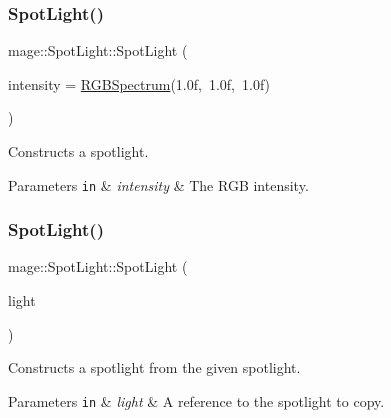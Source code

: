\subsubsection{\texorpdfstring{Spot\+Light()}{SpotLight()}\hspace{0.1cm}{\footnotesize\ttfamily [1/3]}}
{\footnotesize\ttfamily mage\+::\+Spot\+Light\+::\+Spot\+Light (\begin{DoxyParamCaption}\item[{const \hyperlink{structmage_1_1_r_g_b_spectrum}{R\+G\+B\+Spectrum} \&}]{intensity = {\ttfamily \hyperlink{structmage_1_1_r_g_b_spectrum}{R\+G\+B\+Spectrum}(1.0f,~1.0f,~1.0f)} }\end{DoxyParamCaption})\hspace{0.3cm}{\ttfamily [explicit]}}

Constructs a spotlight.


\begin{DoxyParams}[1]{Parameters}
\mbox{\tt in}  & {\em intensity} & The R\+GB intensity. \\
\hline
\end{DoxyParams}
\hypertarget{classmage_1_1_spot_light_a597abd916ed14372be208a68eb01b871}{}\label{classmage_1_1_spot_light_a597abd916ed14372be208a68eb01b871} 
\subsubsection{\texorpdfstring{Spot\+Light()}{SpotLight()}\hspace{0.1cm}{\footnotesize\ttfamily [2/3]}}
{\footnotesize\ttfamily mage\+::\+Spot\+Light\+::\+Spot\+Light (\begin{DoxyParamCaption}\item[{const \hyperlink{classmage_1_1_spot_light}{Spot\+Light} \&}]{light }\end{DoxyParamCaption})\hspace{0.3cm}{\ttfamily [default]}}

Constructs a spotlight from the given spotlight.


\begin{DoxyParams}[1]{Parameters}
\mbox{\tt in}  & {\em light} & A reference to the spotlight to copy. \\
\hline
\end{DoxyParams}
\hypertarget{classmage_1_1_spot_light_a3a5574f34f5b80cbeef00709f8a9d094}{}\label{classmage_1_1_spot_light_a3a5574f34f5b80cbeef00709f8a9d094} 
